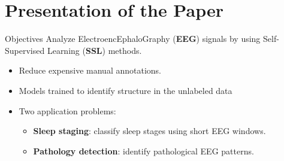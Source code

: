\section{Presentation of the Paper}

\begin{frame}{Objectives}
Analyze ElectroencEphaloGraphy (\textbf{EEG}) signals by using Self-Supervised Learning (\textbf{SSL}) methods.
\begin{itemize}
    \item Reduce expensive manual annotations.
    \item Models trained to identify structure in the unlabeled data
    \item Two application problems:
    \begin{itemize}
        \item \textbf{Sleep staging}: classify sleep stages using short EEG windows.
        \item \textbf{Pathology detection}: identify pathological EEG patterns.
    \end{itemize}
    \end{itemize}
\end{frame}

